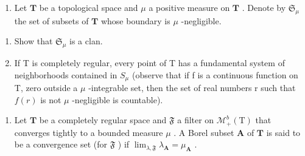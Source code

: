 \exercisesection{}

\begin{enumerate}
\def\labelenumi{\arabic{enumi})}
\tightlist
\item
  Let \(\mathbf{T}\) be a topological space and \(\mu\) a positive measure on \(\mathbf{T}\) . Denote by \(\mathfrak{S}_{\mu}\) the set of subsets of \(\mathbf{T}\) whose boundary is \(\mu\) -negligible.
\end{enumerate}

\begin{enumerate}
\def\labelenumi{\alph{enumi})}
\item
  Show that \(\mathfrak{S}_{\mu}\) is a clan.
\item
  If T is completely regular, every point of T has a fundamental system of neighborhoods contained in \(S_{\mu}\) (observe that if f is a continuous function on T, zero outside a \(\mu\) -integrable set, then the set of real numbers r such that \(f(r)\) is not \(\mu\) -negligible is countable).
\end{enumerate}

\begin{enumerate}
\def\labelenumi{\arabic{enumi})}
\setcounter{enumi}{1}
\tightlist
\item
  Let \(\mathbf{T}\) be a completely regular space and \(\mathfrak{F}\) a filter on \(\mathcal{M}_{+}^{b}(\mathrm{T})\) that converges tightly to a bounded measure \(\mu\) . A Borel subset \(\mathbf{A}\) of \(\mathbf{T}\) is said to be a convergence set (for \(\mathfrak{F}\) ) if \(\lim_{\lambda,\mathfrak{F}} \lambda_{\mathbf{A}} = \mu_{\mathbf{A}}\) .
\end{enumerate}


